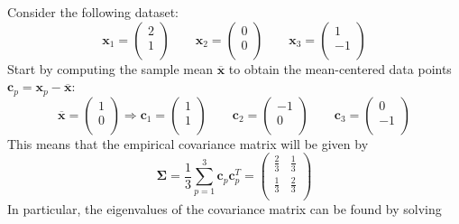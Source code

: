 \documentclass{report}
\begin{document}
\begin{examplebox}
    Consider the following dataset:
    \[\mathbf{x}_1 = \begin{pmatrix}
        2 \\
        1 \\
    \end{pmatrix} \quad\quad \mathbf{x}_2 = \begin{pmatrix}
        0 \\
        0 \\
    \end{pmatrix} \quad\quad \mathbf{x}_3 = \begin{pmatrix}
        1 \\
        -1 \\
    \end{pmatrix}\]
    Start by computing the sample mean $\displaystyle \overline{\mathbf{x}}$ to obtain the mean-centered data points $\displaystyle \mathbf{c}_p = \mathbf{x}_p - \overline{\mathbf{x}}$:
    \[\overline{\mathbf{x}} = \begin{pmatrix}
        1 \\
        0 \\
    \end{pmatrix} \Rightarrow \mathbf{c}_1 = \begin{pmatrix}
        1 \\
        1 \\
    \end{pmatrix} \quad\quad \mathbf{c}_2 = \begin{pmatrix}
        -1 \\
        0 \\
    \end{pmatrix} \quad\quad \mathbf{c}_3 = \begin{pmatrix}
        0 \\
        -1 \\
    \end{pmatrix}\]
    This means that the empirical covariance matrix will be given by
    \[\mathbf{\Sigma} = \frac{1}{3}\sum_{p = 1}^3 \mathbf{c}_p\mathbf{c}_p^T = \begin{pmatrix}
        \frac{2}{3} & \frac{1}{3} \\
        \frac{1}{3} & \frac{2}{3} \\
    \end{pmatrix}\]
    In particular, the eigenvalues of the covariance matrix can be found by solving
    \begin{align*}

\end{align*}
\end{examplebox}
\end{document}
